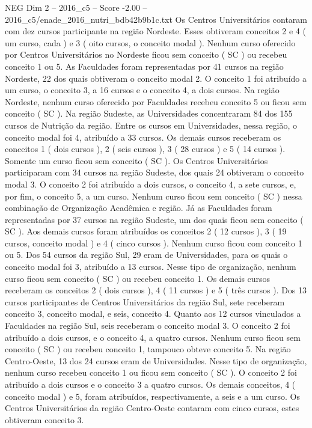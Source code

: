 \begin{textsample}{NEG Dim 2 – 2016\_c5 – Score -2.00 – 2016\_c5/enade\_2016\_nutri\_bdb42b9b1c.txt}
Os Centros Universitários contaram com dez cursos participante na região Nordeste.
Esses obtiveram conceitos 2 e 4 ( um curso, cada ) e 3 ( oito cursos, o conceito modal ).
Nenhum curso oferecido por Centros Universitários no Nordeste ficou sem conceito ( SC ) ou recebeu conceito 1 ou 5.
As Faculdades foram representadas por 41 cursos na região Nordeste, 22 dos quais obtiveram o conceito modal 2.
O conceito 1 foi atribuído a um curso, o conceito 3, a 16 cursos e o conceito 4, a dois cursos.
Na região Nordeste, nenhum curso oferecido por Faculdades recebeu conceito 5 ou ficou sem conceito ( SC ).
Na região Sudeste, as Universidades concentraram 84 dos 155 cursos de Nutrição da região.
Entre os cursos em Universidades, nessa região, o conceito modal foi 4, atribuído a 33 cursos.
Os demais cursos receberam os conceitos 1 ( dois cursos ), 2 ( seis cursos ), 3 ( 28 cursos ) e 5 ( 14 cursos ).
Somente um curso ficou sem conceito ( SC ).
Os Centros Universitários participaram com 34 cursos na região Sudeste, dos quais 24 obtiveram o conceito modal 3.
O conceito 2 foi atribuído a dois cursos, o conceito 4, a sete cursos, e, por fim, o conceito 5, a um curso.
Nenhum curso ficou sem conceito ( SC ) nessa combinação de Organização Acadêmica e região.
Já as Faculdades foram representadas por 37 cursos na região Sudeste, um dos quais ficou sem conceito ( SC ).
Aos demais cursos foram atribuídos os conceitos 2 ( 12 cursos ), 3 ( 19 cursos, conceito modal ) e 4 ( cinco cursos ).
Nenhum curso ficou com conceito 1 ou 5.
Dos 54 cursos da região Sul, 29 eram de Universidades, para os quais o conceito modal foi 3, atribuído a 13 cursos.
Nesse tipo de organização, nenhum curso ficou sem conceito ( SC ) ou recebeu conceito 1.
Os demais cursos receberam os conceitos 2 ( dois cursos ), 4 ( 11 cursos ) e 5 ( três cursos ).
Dos 13 cursos participantes de Centros Universitários da região Sul, sete receberam conceito 3, conceito modal, e seis, conceito 4.
Quanto aos 12 cursos vinculados a Faculdades na região Sul, seis receberam o conceito modal 3.
O conceito 2 foi atribuído a dois cursos, e o conceito 4, a quatro cursos.
Nenhum curso ficou sem conceito ( SC ) ou recebeu conceito 1, tampouco obteve conceito 5.
Na região Centro-Oeste, 13 dos 24 cursos eram de Universidades.
Nesse tipo de organização, nenhum curso recebeu conceito 1 ou ficou sem conceito ( SC ).
O conceito 2 foi atribuído a dois cursos e o conceito 3 a quatro cursos.
Os demais conceitos, 4 ( conceito modal ) e 5, foram atribuídos, respectivamente, a seis e a um curso.
Os Centros Universitários da região Centro-Oeste contaram com cinco cursos, estes obtiveram conceito 3.

\end{textsample}
